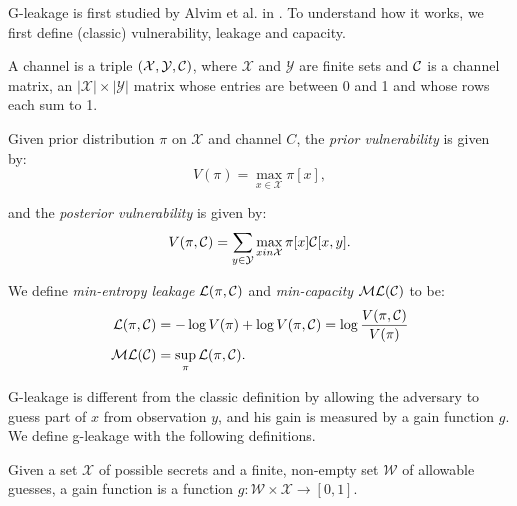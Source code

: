 G-leakage is first studied by Alvim et al. in \cite{6266165}. To understand how it works, we first define (classic) vulnerability, leakage and capacity.


\begin{definition}
	A channel is a triple $(\mathcal{X}, \mathcal{Y}, \mathcal{C})$, where $\mathcal{X}$ and $\mathcal{Y}$ are finite sets and $\mathcal{C}$ is a channel matrix, an $|\mathcal{X}| \times |\mathcal{Y}|$ matrix whose entries are between 0 and 1 and whose rows each sum to 1. 
\end{definition}


\begin{definition}[Vulnerabilities]
Given prior distribution $\pi$ on $\mathcal{X}$ and channel $C$, the \textit{prior vulnerability} is given by:
\begin{equation}
	V(\pi) = \max_{x \in \mathcal{X}} \pi [x],
\end{equation}

and the \textit{posterior vulnerability} is given by:
\begin{equation}
	V(\pi, \mathcal{C}) = \sum_{y \in \mathcal{Y}} \max_{x in \mathcal{X}} \pi [x] \mathcal{C} [x,y].
\end{equation}
\end{definition}


\begin{definition}
We define \textit{min-entropy leakage} $\mathcal{L}(\pi, \mathcal{C})$ and \textit{min-capacity} $\mathcal{ML}(\mathcal{C})$ to be:
\begin{align}
\mathcal{L}(\pi, \mathcal{C}) &= - \log V(\pi) + \log V(\pi, \mathcal{C}) = \log \frac{V(\pi, \mathcal{C})}{V(\pi)} \\
\mathcal{ML}(\mathcal{C}) &= \sup_{\pi} \mathcal{L}(\pi, \mathcal{C}).  
\end{align}
\end{definition}


G-leakage is different from the classic definition by allowing the adversary to guess part of $x$ from observation $y$, and his gain is measured by a gain function $g$. We define g-leakage with the following definitions.


\begin{definition}
Given a set $\mathcal{X}$ of possible secrets and a finite, non-empty set $\mathcal{W}$ of allowable guesses, a gain function is a function $g: \mathcal{W} \times \mathcal{X} \rightarrow [0,1]$.
\end{definition}

